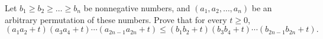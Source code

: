 Let $b_1\ge b_2\ge\ldots\ge b_n$ be nonnegative numbers, and $(a_1,a_2,\ldots,a_n)$ be an arbitrary permutation of these numbers. Prove that for every $t\ge0$,
$$(a_1a_2+t)(a_3a_4+t)\cdots(a_{2n-1}a_{2n}+t)\le(b_1b_2+t)(b_3b_4+t)\cdots(b_{2n-1}b_{2n}+t).$$